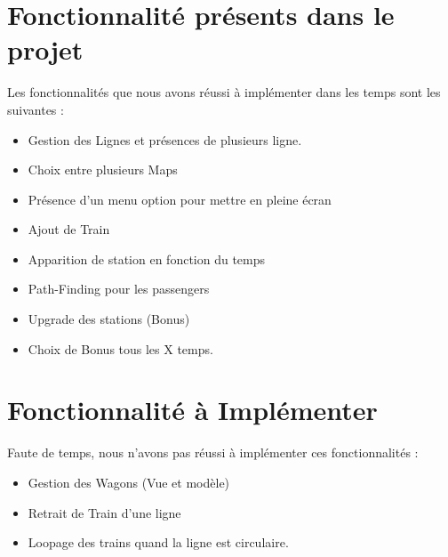 \documentclass[report, backcover, french, nodocumentinfo]{upmethodology-document}
\begin{document}
	\upmdocumentsummary{}
	\upmdocumentauthors{}
	\upmdocumentinformedpeople{}
	\upmpublicationpage{}

	\newpage{}
	\section{Fonctionnalité présents dans le projet}
		\p{}
		Les fonctionnalités que nous avons réussi à implémenter dans les temps sont les suivantes : 
		\begin{itemize}
			\item Gestion des Lignes et présences de plusieurs ligne.
			\item Choix entre plusieurs Maps
			\item Présence d'un menu option pour mettre en pleine écran
			\item Ajout de Train
			\item Apparition de station en fonction du temps
			\item Path-Finding pour les passengers
			\item Upgrade des stations (Bonus)
			\item Choix de Bonus tous les X temps.
		\end{itemize}
	\section{Fonctionnalité à Implémenter}
		\p{}
		Faute de temps, nous n'avons pas réussi à implémenter ces fonctionnalités : 
		\begin{itemize}
			\item Gestion des Wagons (Vue et modèle)
			\item Retrait de Train d'une ligne
			\item Loopage des trains quand la ligne est circulaire.
		\end{itemize}
\end{document}
